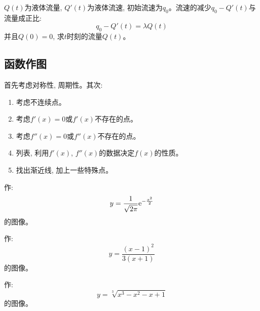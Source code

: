 \begin{example}[(液体过滤问题)]
    $Q(t)$为液体流量, $Q'(t)$为液体流速, 初始流速为$q_0$。流速的减少$q_0 - Q'(t)$与流量成正比:
    \begin{equation*}
        q_0 - Q'(t) = \lambda Q(t)
    \end{equation*}
    并且$Q(0) = 0$, 求$t$时刻的流量$Q(t)$。
\end{example}
\begin{solution}
\end{solution}

\subsection{函数作图}
首先考虑对称性, 周期性。其次:
\begin{enumerate}
    \item 考虑不连续点。
    \item 考虑$f'(x) = 0$或$f'(x)$不存在的点。
    \item 考虑$f''(x) = 0$或$f''(x)$不存在的点。
    \item 列表, 利用$f'(x)$, $f''(x)$的数据决定$f(x)$的性质。
    \item 找出渐近线, 加上一些特殊点。
\end{enumerate}

\begin{example}
    作:
    \begin{equation*}
        y =\frac{1}{\sqrt{2\pi}}\mathrm{e}^{-\frac{x^2}{2}}
    \end{equation*}
    的图像。
\end{example}
\begin{solution}
    
\end{solution}

\begin{example}
    作:
    \begin{equation*}
        y = \frac{(x-1)^2}{3(x+1)}
    \end{equation*}
    的图像。
\end{example}
\begin{solution}
    
\end{solution}

\begin{example}
    作:
    \begin{equation*}
        y = \sqrt[3]{x^3-x^2-x+1}
    \end{equation*}
    的图像。
\end{example}
\begin{solution}
    
\end{solution}

